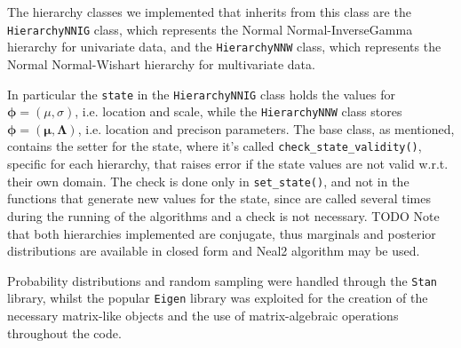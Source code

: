 \begin{itemize}
The hierarchy classes we implemented that inherits from this class are the \verb|HierarchyNNIG| class, which represents the Normal Normal-InverseGamma hierarchy for univariate data, and the \verb|HierarchyNNW| class, which represents the Normal Normal-Wishart hierarchy for multivariate data.

In particular the \verb|state| in the \verb|HierarchyNNIG| class holds the values for $\boldsymbol\phi = (\mu,\sigma)$, i.e.  location and scale, while the \verb|HierarchyNNW| class stores $\boldsymbol\phi = (\boldsymbol\mu,\boldsymbol\Lambda)$, i.e. location and precison parameters.
The base class, as mentioned, contains the setter for the state, where it’s called \verb|check_state_validity()|, specific for each hierarchy, that raises error if the state values are not valid w.r.t. their own domain.
The check is done only in \verb|set_state()|, and not in the functions that generate new values for the state, since are called several times during the running of the algorithms and a check is not necessary. TODO
Note that both hierarchies implemented are conjugate, thus marginals and
posterior distributions are available in closed form and Neal2 algorithm may be used. \
	
\end{itemize}

Probability distributions and random sampling were handled through the \verb|Stan| library, whilst the popular \verb|Eigen| library was exploited for the creation of the necessary matrix-like objects and the use of matrix-algebraic operations throughout the code.